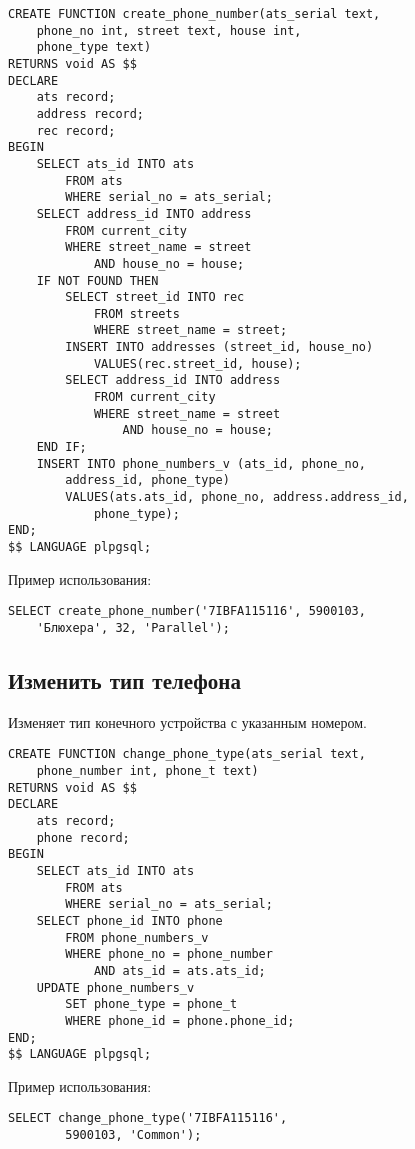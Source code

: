 \documentclass{report}
\begin{document}
\begin{lstlisting}
CREATE FUNCTION create_phone_number(ats_serial text, 
    phone_no int, street text, house int, 
    phone_type text) 
RETURNS void AS $$
DECLARE
    ats record;
    address record;
    rec record;
BEGIN
    SELECT ats_id INTO ats 
        FROM ats 
        WHERE serial_no = ats_serial;
    SELECT address_id INTO address
        FROM current_city
        WHERE street_name = street
            AND house_no = house;
    IF NOT FOUND THEN
        SELECT street_id INTO rec 
            FROM streets 
            WHERE street_name = street;
        INSERT INTO addresses (street_id, house_no)
            VALUES(rec.street_id, house);
        SELECT address_id INTO address
            FROM current_city
            WHERE street_name = street
                AND house_no = house;
    END IF;
    INSERT INTO phone_numbers_v (ats_id, phone_no, 
        address_id, phone_type)
        VALUES(ats.ats_id, phone_no, address.address_id, 
            phone_type);
END;
$$ LANGUAGE plpgsql;
\end{lstlisting}

Пример использования:
\begin{lstlisting}
SELECT create_phone_number('7IBFA115116', 5900103,
    'Блюхера', 32, 'Parallel');
\end{lstlisting}

\subsection*{Изменить тип телефона}

Изменяет тип конечного устройства с указанным номером.

\begin{lstlisting}
CREATE FUNCTION change_phone_type(ats_serial text, 
    phone_number int, phone_t text) 
RETURNS void AS $$
DECLARE
    ats record;
    phone record;
BEGIN
    SELECT ats_id INTO ats 
        FROM ats 
        WHERE serial_no = ats_serial;
    SELECT phone_id INTO phone
        FROM phone_numbers_v
        WHERE phone_no = phone_number
            AND ats_id = ats.ats_id;
    UPDATE phone_numbers_v
        SET phone_type = phone_t 
        WHERE phone_id = phone.phone_id;
END;
$$ LANGUAGE plpgsql;
\end{lstlisting}

Пример использования:
\begin{lstlisting}
SELECT change_phone_type('7IBFA115116',
        5900103, 'Common');
\end{lstlisting}
\end{document}
